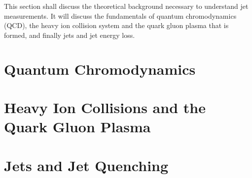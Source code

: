 This section shall discuss the theoretical background necessary to understand jet measurements. It will discuss the fundamentals of quantum chromodynamics (QCD), the heavy ion collision system and the quark gluon plasma that is formed, and finally jets and jet energy loss. 

\section{Quantum Chromodynamics}
\label{sec:qcd}


\section{Heavy Ion Collisions and the Quark Gluon Plasma}
\label{sec:HICollisions}


\section{Jets and Jet Quenching}
\label{sec:jets}

